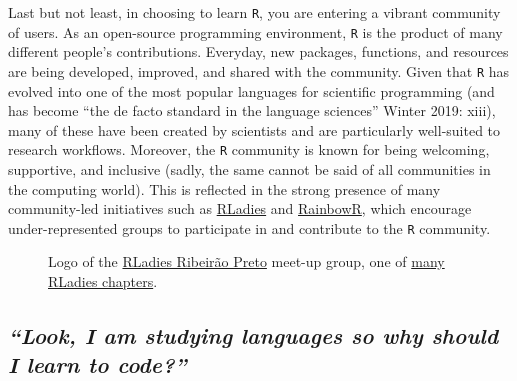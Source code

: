 \documentclass[
  letterpaper,
  DIV=11,
  numbers=noendperiod]{scrreprt}
\begin{document}
Last but not least, in choosing to learn \texttt{R}, you are entering a
vibrant community of users. As an open-source programming environment,
\texttt{R} is the product of many different people's contributions.
Everyday, new packages, functions, and resources are being developed,
improved, and shared with the community. Given that \texttt{R} has
evolved into one of the most popular languages for scientific
programming (and has become ``the de facto standard in the language
sciences'' Winter 2019: xiii), many of these have been created by
scientists and are particularly well-suited to research workflows.
Moreover, the \texttt{R} community is known for being welcoming,
supportive, and inclusive (sadly, the same cannot be said of all
communities in the computing world). This is reflected in the strong
presence of many community-led initiatives such as
\href{https://rladies.org/}{RLadies} and
\href{https://rainbowr.netlify.app/}{RainbowR}, which encourage
under-represented groups to participate in and contribute to the
\texttt{R} community. 🤗

\begin{figure}


\caption{\label{fig-RLadies}Logo of the
\href{https://rladiesrp.github.io/}{RLadies Ribeirão Preto} meet-up
group, one of
\href{https://benubah.github.io/r-community-explorer/rladies.html}{many
RLadies chapters}.}

\end{figure}%

\subsection*{\texorpdfstring{\emph{``Look, I am studying languages so
why should I learn to code?''}
🤔}{``Look, I am studying languages so why should I learn to code?'' 🤔}}\label{look-i-am-studying-languages-so-why-should-i-learn-to-code}
\end{document}
